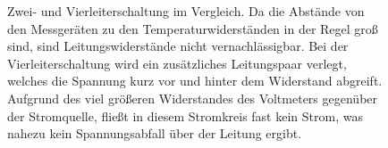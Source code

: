 \begin{figure}[htp]
  \centering
  \caption{Zwei- und Vierleiterschaltung im Vergleich. Da die Abstände von den Messgeräten zu den Temperaturwiderständen in der Regel groß sind, sind Leitungswiderstände nicht vernachlässigbar. Bei der Vierleiterschaltung wird ein zusätzliches Leitungspaar verlegt, welches die Spannung kurz vor und hinter dem Widerstand abgreift. Aufgrund des viel größeren Widerstandes des Voltmeters gegenüber der Stromquelle, fließt in diesem Stromkreis fast kein Strom, was nahezu kein Spannungsabfall über der Leitung ergibt.}
  \label{fig:Schaltung}
\end{figure}
